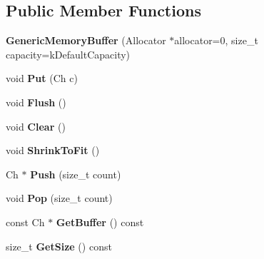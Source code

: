 \subsection*{Public Member Functions}
\begin{DoxyCompactItemize}
\item 
\mbox{\label{structGenericMemoryBuffer_ad08f7da47bca43fcdb0c3b10e22dfa1d}} 
{\bfseries Generic\+Memory\+Buffer} (Allocator $\ast$allocator=0, size\+\_\+t capacity=k\+Default\+Capacity)
\item 
\mbox{\label{structGenericMemoryBuffer_a9dfb477983e211893601f8ab637b42d8}} 
void {\bfseries Put} (Ch c)
\item 
\mbox{\label{structGenericMemoryBuffer_a9861181cab6f5bec2ec08b601aa53575}} 
void {\bfseries Flush} ()
\item 
\mbox{\label{structGenericMemoryBuffer_a036cbe2556778e1edc525602a9821df2}} 
void {\bfseries Clear} ()
\item 
\mbox{\label{structGenericMemoryBuffer_a3b87deb9bf34c394c8fb262ab53c0c4b}} 
void {\bfseries Shrink\+To\+Fit} ()
\item 
\mbox{\label{structGenericMemoryBuffer_a56f7b14d2940b682fe592f598d6792ec}} 
Ch $\ast$ {\bfseries Push} (size\+\_\+t count)
\item 
\mbox{\label{structGenericMemoryBuffer_a82a6706286f1356e1769282f5d496005}} 
void {\bfseries Pop} (size\+\_\+t count)
\item 
\mbox{\label{structGenericMemoryBuffer_a8d7be8b1d64285b787571541a7c4bb37}} 
const Ch $\ast$ {\bfseries Get\+Buffer} () const
\item 
\mbox{\label{structGenericMemoryBuffer_aaab1f18d03109ab01213d3e3d8368ff9}} 
size\+\_\+t {\bfseries Get\+Size} () const
\item 
\mbox{\label{structGenericMemoryBuffer_ad08f7da47bca43fcdb0c3b10e22dfa1d}} 

\end{DoxyCompactItemize}
